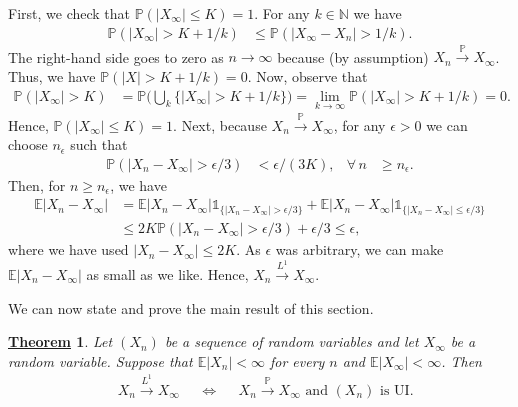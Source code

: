 \documentclass[12pt]{book}
\let\varepsilon\epsilon
\numberwithin{equation}{chapter}
\theoremstyle{plain}
\newtheorem{theorem}{\underline{Theorem}}
\numberwithin{theorem}{section}
\theoremstyle{definition}
\numberwithin{exercise}{chapter}
\let\oldendproof\endproof
\renewenvironment{proof}[1][\proofname]{%
  \oldproof[\scshape\underline{#1}]%
}{\oldendproof}
\newcommand{\<}{\langle}
\renewcommand{\>}{\rangle}
\renewcommand{\(}{\left(}
\renewcommand{\)}{\right)}
\renewcommand{\[}{\left[}
\renewcommand{\]}{\right]}
\newcommand\Eb{\mathds{E}}
\newcommand\Ib{\mathds{1}} 	%
\newcommand\Pb{\mathds{P}}
\newcommand\Nb{\mathds{N}}
\newcommand\eps{\varepsilon}
\begin{document}
\begin{proof}
First, we check that $\Pb( |X_\infty| \leq K ) = 1$.  For any $k \in \Nb$ we have
\begin{align}
\Pb( |X_\infty| > K + 1/k) 
	&\leq \Pb( |X_\infty-X_n| > 1/k) .
\end{align}
The right-hand side goes to zero as $n \to \infty$ because (by assumption) $X_n \stackrel{\Pb}{\to} X_\infty$.  Thus, we have $\Pb( |X| > K + 1/k) = 0$.  Now, observe that
\begin{align}
\Pb( |X_\infty| > K )
	&=	\Pb \Big( \bigcup_k \{ |X_\infty| > K + 1/k \} \Big)
	=		\lim_{k \to \infty} \Pb ( |X_\infty| > K + 1/k )
	= 	0 .
\end{align}
Hence, $\Pb( |X_\infty| \leq K ) = 1$.  Next, because $X_n \stackrel{\Pb}{\to} X_\infty$, for any $\eps>0$ we can choose $n_\eps$ such that
\begin{align}
\Pb( |X_n - X_\infty | > \eps/3) 
	&< \eps/(3K) , &
\forall \, n
	&\geq n_\eps .
\end{align}
Then, for $n \geq n_\eps$, we have
\begin{align}
\Eb |X_n - X_\infty|
	&=	\Eb |X_n - X_\infty| \Ib_{\{|X_n - X_\infty|>\eps/3\}} + \Eb |X_n - X_\infty| \Ib_{\{|X_n - X_\infty| \leq \eps/3\}} \\
	&\leq 2 K \Pb( |X_n - X_\infty| > \eps/3) + \eps/3 \leq \eps ,
\end{align}
where we have used $|X_n - X_\infty| \leq 2 K$.  As $\eps$ was arbitrary, we can make $\Eb |X_n - X_\infty|$ as small as we like.  Hence, $X_n \stackrel{L^1}{\to} X_\infty$.
\end{proof}

\noindent
We can now state and prove the main result of this section.

\begin{theorem}
\label{thm:UI}
Let $(X_n)$ be a sequence of random variables and let $X_\infty$ be a random variable.  Suppose that $\Eb |X_n| < \infty$ for every $n$ and $\Eb |X_\infty | < \infty$.  Then
\begin{align}
&X_n \stackrel{L^1}{\to} X_\infty&
&\Leftrightarrow&
&\text{$X_n \stackrel{\Pb}{\to} X_\infty$ and $(X_n)$ is UI}.
\end{align}
\end{theorem}
\end{document}
